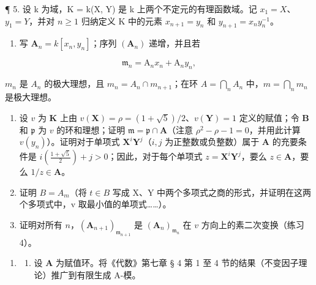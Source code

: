 ¶ 5. 设 k 为域，K = k(X, Y) 是 k 上两个不定元的有理函数域。记 \(x_{1} = X\)、\(y_{1} = Y\)，并对 \(n \geqslant 1\) 归纳定义 K 中的元素 \(x_{n+1} = y_{n}\) 和 \(y_{n+1} = x_{n}y_{n}^{-1}\)。

\begin{enumerate}
\def\labelenumi{(\alph{enumi})}
\tightlist
\item
  写 \(\mathbf{A}_n = k[x_n, y_n]\)；序列 \((\mathbf{A}_n)\) 递增，并且若
\end{enumerate}

\[
\mathfrak {m} _ {n} = \mathrm{A} _ {n} x _ {n} + \mathrm{A} _ {n} y _ {n},
\]

\(m_{n}\) 是 \(A_{n}\) 的极大理想，且 \(m_{n} = A_{n} \cap m_{n+1}\)；在环 \(A = \bigcap_{n} A_{n}\) 中，\(m = \bigcap_{n} m_{n}\) 是极大理想。

\begin{enumerate}
\def\labelenumi{(\alph{enumi})}
\setcounter{enumi}{1}
\item
  设 \(v\) 为 \(\mathbf{K}\) 上由 \(v(\mathbf{X}) = \rho = (1 + \sqrt{5}) / 2\)、\(v(\mathbf{Y}) = 1\) 定义的赋值；令 \(\mathbf{B}\) 和 \(\mathfrak{p}\) 为 \(v\) 的环和理想；证明 \(\mathfrak{m} = \mathfrak{p} \cap \mathbf{A}\)（注意 \(\rho^2 - \rho - 1 = 0\)，并用此计算 \(v(y_n)\)）。证明对于单项式 \(\mathbf{X}^i\mathbf{Y}^j\)（\(i, j\) 为正整数或负整数）属于 \(\mathbf{A}\) 的充要条件是 \(i\left(\frac{1 + \sqrt{5}}{2}\right) + j > 0\)；因此，对于每个单项式 \(z = \mathbf{X}^i\mathbf{Y}^j\)，要么 \(z \in \mathbf{A}\)，要么 \(1/z \in \mathbf{A}\)。
\item
  证明 \(B = A_{m}\)（将 \(t \in B\) 写成 X、Y 中两个多项式之商的形式，并证明在这两个多项式中，v 取最小值的单项式……）。
\item
  证明对所有 \(n\)，\((\mathbf{A}_{n+1})_{\mathfrak{m}_{n+1}}\) 是 \((\mathbf{A}_n)_{\mathfrak{m}_n}\) 在 \(v\) 方向上的素二次变换（练习 4）。
\end{enumerate}

\begin{enumerate}
\def\labelenumi{\arabic{enumi}.}
\setcounter{enumi}{5}
\tightlist
\item
  \begin{enumerate}
  \def\labelenumii{(\alph{enumii})}
  \tightlist
  \item
    设 \(\mathbf{A}\) 为赋值环。将《代数》第七章 § 4 第 1 至 4 节的结果（不变因子理论）推广到有限生成 A-模。
  \end{enumerate}
\end{enumerate}

